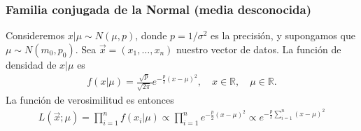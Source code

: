 \subsubsection{Familia conjugada de la Normal (media desconocida)}
Consideremos $x | \mu \sim N(\mu,p)$, donde $p = 1/\sigma^2$ es la precisión, y supongamos que $\mu \sim N(m_0,p_0)$. Sea $\vec{x} = (x_1,\ldots,x_n)$ nuestro vector de datos. La función de densidad de $x | \mu$ es
\begin{align*}
    f(x | \mu) = \frac{\sqrt{p}}{\sqrt{2\pi}}e^{-\frac{p}{2}(x-\mu)^2}, \quad x \in \mathbb{R}, \quad \mu \in \mathbb{R}.
\end{align*}
La función de verosimilitud es entonces
\begin{align*}
    L(\vec{x};\mu) = \prod_{i=1}^{n} f(x_i | \mu) \propto \prod_{i=1}^{n} e^{-\frac{p}{2}(x-\mu)^2} \propto e^{-\frac{p}{2}\sum_{i=1}^{n}(x-\mu)^2}
\end{align*}

